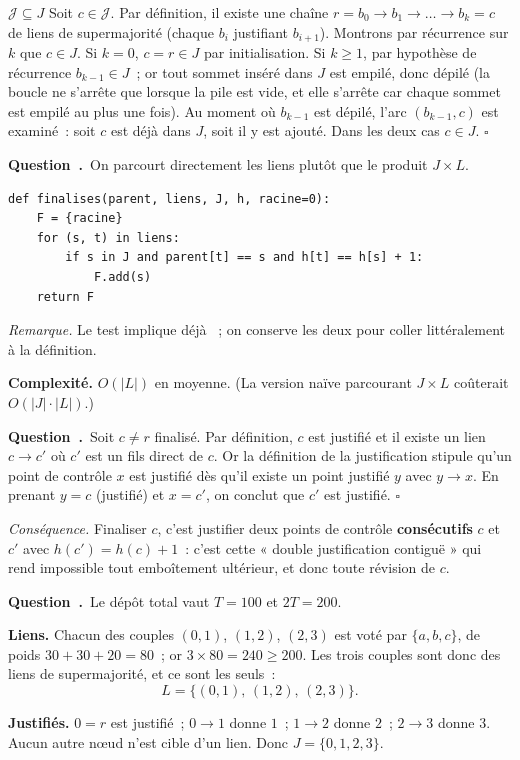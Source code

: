 \documentclass[11pt,a4paper]{article}
\renewcommand{\Q}{\medskip\par\stepcounter{qcnt}\noindent\textbf{\color{cnc}Question~\theqcnt.}~}
\begin{document}
$\boxed{\mathcal{J}\subseteq J}$ Soit $c\in\mathcal{J}$. Par définition, il existe une chaîne
$r=b_0\to b_1\to\dots\to b_k=c$ de liens de supermajorité (chaque $b_{i}$ justifiant
$b_{i+1}$). Montrons par récurrence sur $k$ que $c\in J$. Si $k=0$, $c=r\in J$ par
initialisation. Si $k\ge 1$, par hypothèse de récurrence $b_{k-1}\in J$~; or tout sommet
inséré dans $J$ est empilé, donc dépilé (la boucle ne s'arrête que lorsque la pile est vide,
et elle s'arrête car chaque sommet est empilé au plus une fois). Au moment où $b_{k-1}$ est
dépilé, l'arc $(b_{k-1},c)$ est examiné~: soit $c$ est déjà dans $J$, soit il y est ajouté.
Dans les deux cas $c\in J$. \hfill$\square$

\Q On parcourt directement les liens plutôt que le produit $J\times L$.
\begin{lstlisting}
def finalises(parent, liens, J, h, racine=0):
    F = {racine}
    for (s, t) in liens:
        if s in J and parent[t] == s and h[t] == h[s] + 1:
            F.add(s)
    return F
\end{lstlisting}
\emph{Remarque.} Le test  implique déjà ~; on
conserve les deux pour coller littéralement à la définition.

\textbf{Complexité.} $O(|L|)$ en moyenne. (La version naïve parcourant $J\times L$ coûterait
$O(|J|\cdot|L|)$.)

\Q Soit $c\ne r$ finalisé. Par définition, $c$ est justifié et il existe un lien $c\to c'$
où $c'$ est un fils direct de $c$. Or la définition de la justification stipule qu'un point
de contrôle $x$ est justifié dès qu'il existe un point justifié $y$ avec $y\to x$. En prenant
$y=c$ (justifié) et $x=c'$, on conclut que $c'$ est justifié. \hfill$\square$

\emph{Conséquence.} Finaliser $c$, c'est justifier deux points de contrôle
\textbf{consécutifs} $c$ et $c'$ avec $h(c')=h(c)+1$~: c'est cette « double justification
contiguë » qui rend impossible tout emboîtement ultérieur, et donc toute révision de $c$.

\Q Le dépôt total vaut $T=100$ et $2T=200$.

\textbf{Liens.} Chacun des couples $(0,1)$, $(1,2)$, $(2,3)$ est voté par $\{a,b,c\}$, de
poids $30+30+20=80$~; or $3\times 80 = 240 \ge 200$. Les trois couples sont donc des liens
de supermajorité, et ce sont les seuls~:
\[ L = \{(0,1),\,(1,2),\,(2,3)\}. \]

\textbf{Justifiés.} $0=r$ est justifié~; $0\to 1$ donne $1$~; $1\to 2$ donne $2$~; $2\to 3$
donne $3$. Aucun autre n\oe ud n'est cible d'un lien. Donc
$J=\{0,1,2,3\}$.
\end{document}

